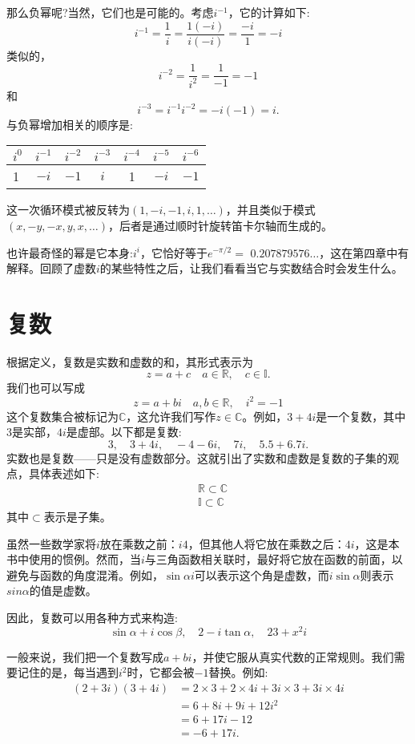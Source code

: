 那么负幂呢?当然，它们也是可能的。考虑$i^{-1}$，它的计算如下:
$$
i^{-1}=\frac{1}{i}=\frac{1(-i)}{i(-i)}=\frac{-i}{1}=-i
$$
类似的，
$$
i^{-2}=\frac{1}{i^{2}}=\frac{1}{-1}=-1
$$
和
$$
i^{-3}=i^{-1} i^{-2}=-i(-1)=i .
$$
与负幂增加相关的顺序是:
\begin{center}
\begin{tabular}{lcccccc}
\hline
$i^{0}$ & $i^{-1}$ & $i^{-2}$ & $i^{-3}$ & $i^{-4}$ & $i^{-5}$ & $i^{-6}$ \\
\hline
1 & $-i$ & $-1$ & $i$ & 1 & $-i$ & $-1$ \\
\hline
\end{tabular}
\end{center}
这一次循环模式被反转为$(1,-i,-1, i, 1, \ldots)$，并且类似于模式$(x,-y,-x, y, x, \ldots)$，后者是通过顺时针旋转笛卡尔轴而生成的。

也许最奇怪的幂是它本身:$i^{i}$，它恰好等于$e^{-\pi / 2}=$ $0.207879576 \ldots$，这在第四章中有解释。回顾了虚数$i$的某些特性之后，让我们看看当它与实数结合时会发生什么。

\section{复数}
根据定义，复数是实数和虚数的和，其形式表示为
$$
z=a+c \quad a \in \mathbb{R}, \quad c \in \mathbb{I} .
$$
我们也可以写成
$$
z=a+b i \quad a, b \in \mathbb{R}, \quad i^{2}=-1
$$
这个复数集合被标记为$\mathbb{C}$，这允许我们写作$z \in\mathbb{C}$。例如，$3+ 4i $是一个复数，其中3是实部，$ 4i $是虚部。以下都是复数:
$$
3, \quad 3+4 i, \quad-4-6 i, \quad 7 i, \quad 5.5+6.7 i .
$$
实数也是复数——只是没有虚数部分。这就引出了实数和虚数是复数的子集的观点，具体表述如下:
$$
\begin{aligned}
& \mathbb{R} \subset \mathbb{C} \\
& \mathbb{I} \subset \mathbb{C}
\end{aligned}
$$
其中$\subset$表示是子集。

虽然一些数学家将$i$放在乘数之前：$ i4 $，但其他人将它放在乘数之后：$ 4i $，这是本书中使用的惯例。然而，当$i$与三角函数相关联时，最好将它放在函数的前面，以避免与函数的角度混淆。例如，$\sin \alpha i$可以表示这个角是虚数，而$i \sin \alpha$则表示$ sin \alpha$的值是虚数。

因此，复数可以用各种方式来构造:
$$
\sin \alpha+i \cos \beta, \quad 2-i \tan \alpha, \quad 23+x^{2} i
$$

一般来说，我们把一个复数写成$a+ bi $，并使它服从真实代数的正常规则。我们需要记住的是，每当遇到$i^{2}$时，它都会被$-1$替换。例如:
$$
\begin{aligned}
(2+3 i)(3+4 i) & =2 \times 3+2 \times 4 i+3 i \times 3+3 i \times 4 i \\
& =6+8 i+9 i+12 i^{2} \\
& =6+17 i-12 \\
& =-6+17 i .
\end{aligned}
$$


